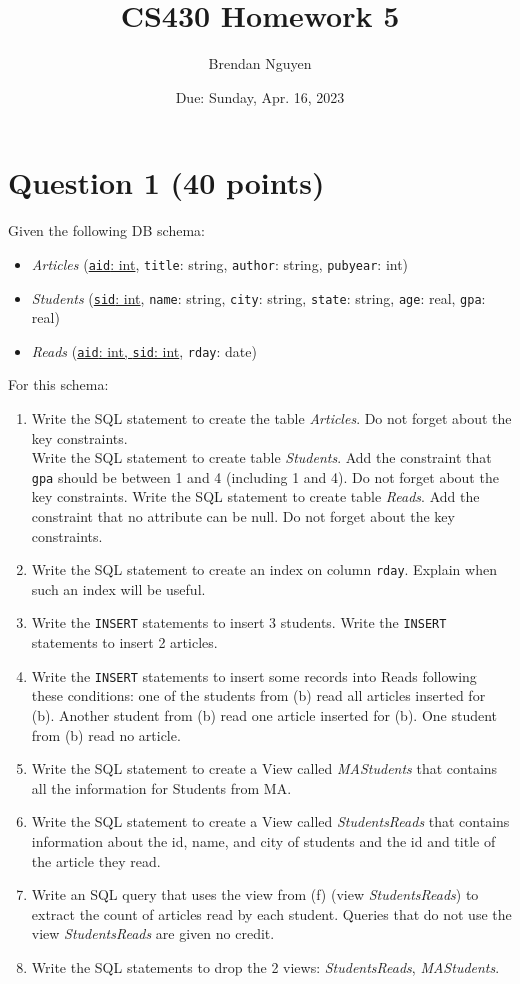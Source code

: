 \documentclass[letterpaper, 11pt]{article}
\title{CS430 Homework 5}
\author{Brendan Nguyen}
\date{Due: Sunday, Apr. 16, 2023}
\begin{document}
\maketitle

\section*{Question 1 (40 points)}

Given the following DB schema:
\begin{itemize}
    \item \textit{Articles} (\underline{\texttt{aid}: int}, \texttt{title}: string, \texttt{author}: string, \texttt{pubyear}: int)
    \item \textit{Students} (\underline{\texttt{sid}: int}, \texttt{name}: string, \texttt{city}: string, \texttt{state}: string, \texttt{age}: real, \texttt{gpa}: real)
    \item \textit{Reads} (\underline{\texttt{aid}: int, \texttt{sid}: int}, \texttt{rday}: date)
\end{itemize}

For this schema:
\begin{enumerate}[label={\alph*})]
    \item Write the SQL statement to create the table \textit{Articles}. Do not forget about the key constraints.\\
    Write the SQL statement to create table \textit{Students}. Add the constraint that \texttt{gpa} should be between 1 and 4 (including 1 and 4). Do not forget about the key constraints. Write the SQL statement to create table \textit{Reads}. Add the constraint that no attribute can be null. Do not forget about the key constraints.
    \item Write the SQL statement to create an index on column \texttt{rday}. Explain when such an index will be useful.
    \item Write the \texttt{INSERT} statements to insert 3 students. Write the \texttt{INSERT} statements to insert 2 articles.
    \item Write the \texttt{INSERT} statements to insert some records into Reads following these conditions: one of the students from (b) read all articles inserted for (b). Another student from (b) read one article inserted for (b). One student from (b) read no article. 
    \item Write the SQL statement to create a View called \textit{MAStudents} that contains all the information for Students from MA.
    \item Write the SQL statement to create a View called \textit{StudentsReads} that contains information about the id, name, and city of students and the id and title of the article they read.
    \item Write an SQL query that uses the view from (f) (view \textit{StudentsReads}) to extract the count of articles read by each student. Queries that do not use the view \textit{StudentsReads} are given no credit.
    \item Write the SQL statements to drop the 2 views: \textit{StudentsReads}, \textit{MAStudents}.
\end{enumerate}
\end{document}
